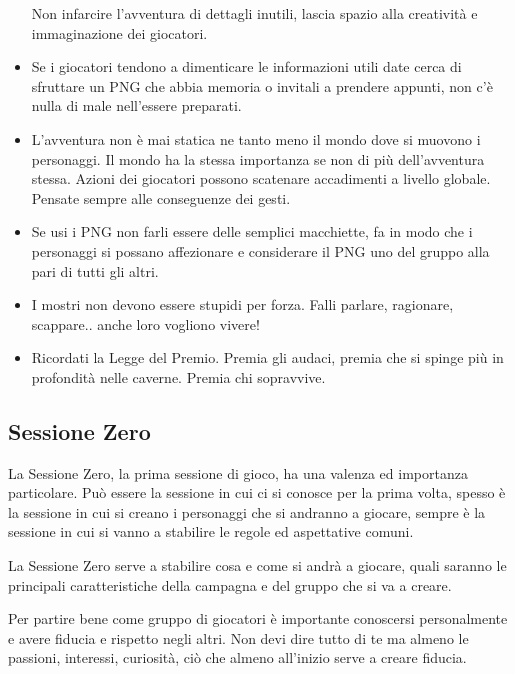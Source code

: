 \begin{multicols}{2}
\begin{itemize}[leftmargin=*]
Non infarcire l'avventura di dettagli inutili, lascia spazio alla creatività e immaginazione dei giocatori. %

\item
Se i giocatori tendono a dimenticare le informazioni utili date cerca di sfruttare un PNG che abbia memoria o invitali a prendere appunti, non c'è nulla di male nell'essere preparati.

\item
L'avventura non è mai statica ne tanto meno il mondo dove si muovono i personaggi.
Il mondo ha la stessa importanza se non di più dell'avventura stessa. Azioni dei giocatori possono scatenare accadimenti a livello globale. Pensate sempre alle conseguenze dei gesti.

\item
Se usi i PNG non farli essere delle semplici macchiette, fa in modo che i personaggi si possano affezionare e considerare il PNG uno del gruppo alla pari di tutti gli altri.

\item
I mostri non devono essere stupidi per forza. Falli parlare, ragionare, scappare.. anche loro vogliono vivere!

\item
Ricordati la Legge del Premio. Premia gli audaci, premia che si spinge più in profondità nelle caverne. Premia chi sopravvive.

\end{itemize}

\subsection{Sessione Zero}\label{sessionezero}\hypertarget{sessionezero}{}

La Sessione Zero, la prima sessione di gioco, ha una valenza ed importanza particolare. Può essere la sessione in cui ci si conosce per la prima volta, spesso è la sessione in cui si creano i personaggi che si andranno a giocare, sempre è la sessione in cui si vanno a stabilire le regole ed aspettative comuni.

La Sessione Zero serve a stabilire cosa e come si andrà a giocare, quali saranno le principali caratteristiche della campagna e del gruppo che si va a creare.

Per partire bene come gruppo di giocatori è importante conoscersi personalmente e avere fiducia e rispetto negli altri. Non devi dire tutto di te ma almeno le passioni, interessi, curiosità, ciò che almeno all'inizio serve a creare fiducia.


\end{multicols}
